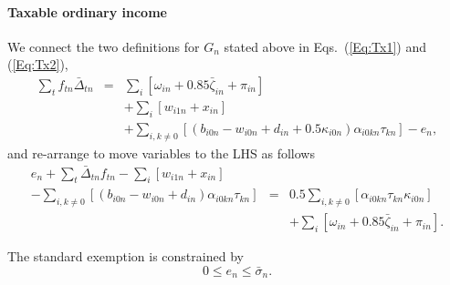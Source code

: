\documentclass{report}[fleqn,11pt]
\begin{document}
\paragraph*{Taxable ordinary income}
	We connect the two definitions for $G_n$ stated above in Eqs.~(\ref{Eq:Tx1}) and (\ref{Eq:Tx2}),
	\begin{eqnarray}
		\sum_t f_{t n}\bar{\Delta}_{t n} &=&
		\sum_i [\omega_{in} + 0.85\bar\zeta_{in} + \pi_{in}]  \nonumber \\
		&& + \sum_i [w_{i1n} + x_{in} ]
		\nonumber\\
		&& + \sum_{i,k\neq 0} [(b_{i0n} - w_{i0n} + d_{in}
		     + 0.5\kappa_{i0n})\alpha_{i0kn}\tau_{kn}] - e_n,
	\end{eqnarray}
	and re-arrange to move variables to the LHS as follows
	\begin{eqnarray}
		\label{Eq:C6}
		e_n + \sum_t \bar{\Delta}_{t n} f_{t n}
		- \sum_i [ w_{i1n} + x_{in}] &&
		\nonumber \\
		- \sum_{i,k\neq 0} [(b_{i0n} - w_{i0n} + d_{in})\alpha_{i0kn}\tau_{kn}] &=&
		0.5\sum_{i,k\neq 0} [\alpha_{i0kn}\tau_{kn}\kappa_{i0n}]
		\nonumber \\
		&& + \sum_i [\omega_{in} + 0.85\bar\zeta_{in} + \pi_{in} ] .
	\end{eqnarray}

	The standard exemption is constrained by
	\begin{equation}
		0 \le e_n \le \bar{\sigma}_n.
	\end{equation}
\end{document}
